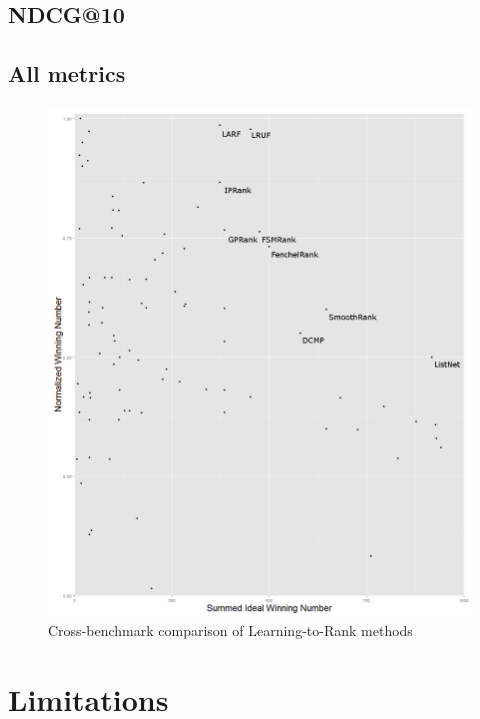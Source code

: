 \subsection{NDCG@10}

\subsection{All metrics}
\begin{figure}[!h]
\includegraphics[scale=0.40]{gfx/combined_normalized_winnum}
\caption{Cross-benchmark comparison of Learning-to-Rank methods}
\label{fig:normalised_winning_number_all}
\end{figure}

\section{Limitations}